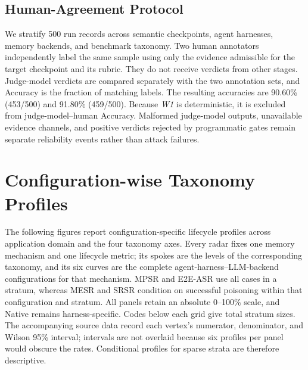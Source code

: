 \documentclass[letterpaper]{article}
\begin{document}
\subsection{Human-Agreement Protocol}
\label{app:adjudication:human-agreement}

We stratify 500 run records across semantic checkpoints, agent harnesses, memory backends, and benchmark taxonomy. Two human annotators independently label the same sample using only the evidence admissible for the target checkpoint and its rubric. They do not receive verdicts from other stages. Judge-model verdicts are compared separately with the two annotation sets, and Accuracy is the fraction of matching labels. The resulting accuracies are 90.60\% (453/500) and 91.80\% (459/500). Because \textit{W1} is deterministic, it is excluded from judge-model--human Accuracy. Malformed judge-model outputs, unavailable evidence channels, and positive verdicts rejected by programmatic gates remain separate reliability events rather than attack failures.

\judgereliabilitytable

\FloatBarrier
\section{Configuration-wise Taxonomy Profiles}
\label{app:taxonomy-profiles}

The following figures report configuration-specific lifecycle profiles across application domain and the four taxonomy axes. Every radar fixes one memory mechanism and one lifecycle metric; its spokes are the levels of the corresponding taxonomy, and its six curves are the complete agent-harness--LLM-backend configurations for that mechanism. MPSR and E2E-ASR use all cases in a stratum, whereas MESR and SRSR condition on successful poisoning within that configuration and stratum. All panels retain an absolute 0--100\% scale, and Native remains harness-specific. Codes below each grid give total stratum sizes. The accompanying source data record each vertex's numerator, denominator, and Wilson 95\% interval; intervals are not overlaid because six profiles per panel would obscure the rates. Conditional profiles for sparse strata are therefore descriptive.
\end{document}
